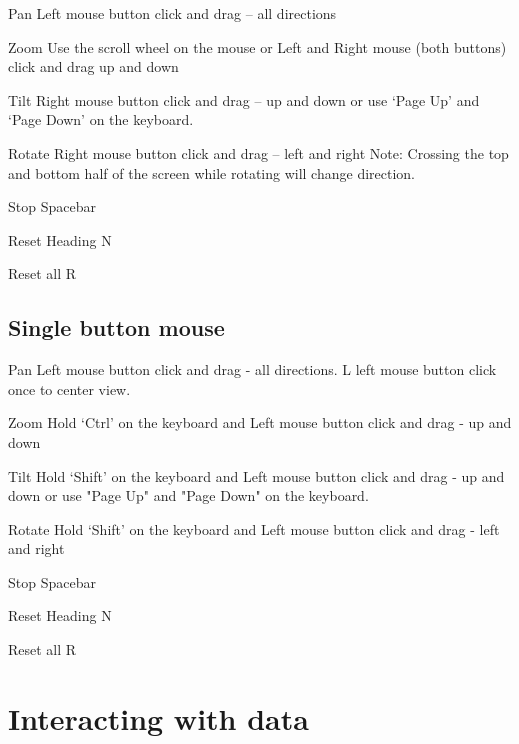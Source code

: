 \begin{description*}
      \item[Pan] Left mouse button click and drag -- all directions
      \item[Zoom] Use the scroll wheel on the mouse or Left and Right mouse (both buttons) click and drag up and down
      \item[Tilt] Right mouse button click and drag -- up and down or use `Page Up' and `Page Down' on the keyboard.
      \item[Rotate] Right mouse button click and drag -- left and right Note: Crossing the top and bottom half of the screen while rotating will change direction.
      \item[Stop] Spacebar
      \item[Reset Heading] N
      \item[Reset all] R 
\end{description*}



\subsection{Single button mouse}
\begin{description*}
     \item[Pan] Left mouse button click and drag - all directions. L left mouse button click once to center view.
     \item[Zoom] Hold `Ctrl' on the keyboard and Left mouse button click and drag - up and down
     \item[Tilt] Hold `Shift' on the keyboard and Left mouse button click and drag - up and down or use "Page Up" and "Page Down" on the keyboard.
     \item[Rotate] Hold `Shift' on the keyboard and Left mouse button click and drag - left and right
     \item[Stop] Spacebar
     \item[Reset Heading] N
     \item[Reset all] R 
\end{description*}


\section{Interacting with data}

